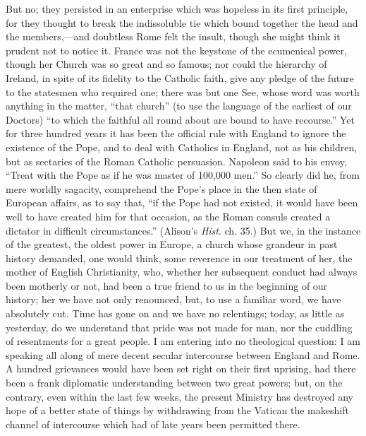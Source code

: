 But no; they persisted in an enterprise which was hopeless in its
first principle, for they thought to break the indissoluble tie which
bound together the head and the members,—and doubtless Rome felt the
insult, though she might think it prudent not to notice it. France was
not the keystone of the ecumenical power, though her Church was so great
and so famous; nor could the hierarchy of Ireland, in spite of its
fidelity to the Catholic faith, give any pledge of the future to the
statesmen who required one; there was but one See, whose word was worth
anything in the matter, ``that church'' (to use the language of
the earliest of our Doctors) ``to which the faithful all round about
are bound to have recourse.'' Yet for three hundred years it has
been the official rule with England to ignore the existence of the Pope,
and to deal with Catholics in England, not as his children, but as
sectaries of the Roman Catholic persuasion. Napoleon said to his envoy,
``Treat with the Pope as if he was master of 100,000 men.'' So
clearly did he, from mere worldly sagacity, comprehend the Pope's place
in the then state of European affairs, as to say that, ``if the Pope
had not existed, it would have been well to have created him for that
occasion, as the Roman consuls created a dictator in difficult circumstances.'' (Alison's \emph{Hist}. ch. 35.) But we, in the
instance of the greatest, the oldest power in Europe, a church whose
grandeur in past history demanded, one would think, some reverence in
our treatment of her, the mother of English Christianity, who, whether
her subsequent conduct had always been motherly or not, had been a true
friend to us in the beginning of our history; her we have not only
renounced, but, to use a familiar word, we have absolutely cut. Time has
gone on and we have no relentings; today, as little as yesterday, do we
understand that pride was not made for man, nor the cuddling of
resentments for a great people. I am entering into no theological
question: I am speaking all along of mere decent secular intercourse
between England and Rome. A hundred grievances would have been set right
on their first uprising, had there been a frank diplomatic understanding
between two great powers; but, on the contrary, even within the last few
weeks, the present Ministry has destroyed any hope of a better state of
things by withdrawing from the Vatican the makeshift channel of
intercourse which had of late years been permitted there.

